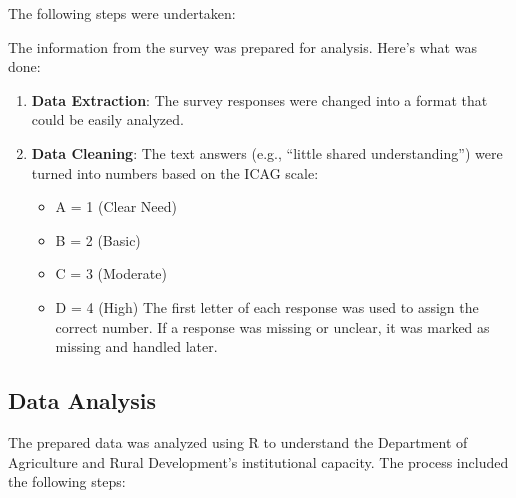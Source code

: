 \documentclass[
  10pt,
]{report}
\providecommand{\tightlist}{%
  \setlength{\itemsep}{0pt}\setlength{\parskip}{0pt}}
\begin{document}
The following steps were undertaken:

The information from the survey was prepared for analysis. Here's what
was done:

\begin{enumerate}
\def\labelenumi{\arabic{enumi}.}
\tightlist
\item
  \textbf{Data Extraction}: The survey responses were changed into a
  format that could be easily analyzed.
\item
  \textbf{Data Cleaning}: The text answers (e.g., ``little shared
  understanding'') were turned into numbers based on the ICAG scale:

  \begin{itemize}
  \tightlist
  \item
    A = 1 (Clear Need)
  \item
    B = 2 (Basic)
  \item
    C = 3 (Moderate)
  \item
    D = 4 (High) The first letter of each response was used to assign
    the correct number. If a response was missing or unclear, it was
    marked as missing and handled later.
  \end{itemize}
\end{enumerate}

\subsection{Data Analysis}\label{data-analysis}

The prepared data was analyzed using R to understand the Department of
Agriculture and Rural Development's institutional capacity. The process
included the following steps:
\end{document}
